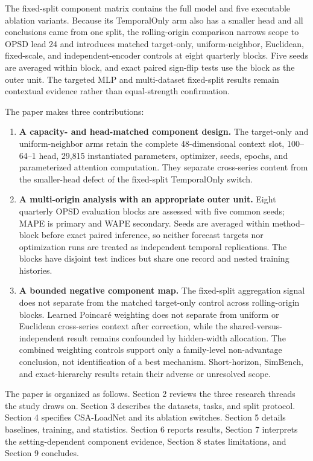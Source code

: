 \documentclass[electronics,article,submit,moreauthors]{Definitions/mdpi}
\providecommand{\tightlist}{\setlength{\itemsep}{0pt}\setlength{\parskip}{0pt}}
\begin{document}
The fixed-split component matrix contains the full model and five executable ablation variants. Because its TemporalOnly arm also has a smaller head and all conclusions came from one split, the rolling-origin comparison narrows scope to OPSD lead 24 and introduces matched target-only, uniform-neighbor, Euclidean, fixed-scale, and independent-encoder controls at eight quarterly blocks. Five seeds are averaged within block, and exact paired sign-flip tests use the block as the outer unit. The targeted MLP and multi-dataset fixed-split results remain contextual evidence rather than equal-strength confirmation.

The paper makes three contributions:

\begin{enumerate}
\def\labelenumi{\arabic{enumi}.}
\tightlist
\item
  \textbf{A capacity- and head-matched component design.} The target-only and uniform-neighbor arms retain the complete 48-dimensional context slot, 100--64--1 head, 29,815 instantiated parameters, optimizer, seeds, epochs, and parameterized attention computation. They separate cross-series content from the smaller-head defect of the fixed-split TemporalOnly switch.
\item
  \textbf{A multi-origin analysis with an appropriate outer unit.} Eight quarterly OPSD evaluation blocks are assessed with five common seeds; MAPE is primary and WAPE secondary. Seeds are averaged within method--block before exact paired inference, so neither forecast targets nor optimization runs are treated as independent temporal replications. The blocks have disjoint test indices but share one record and nested training histories.
\item
  \textbf{A bounded negative component map.} The fixed-split aggregation signal does not separate from the matched target-only control across rolling-origin blocks. Learned Poincar\'{e} weighting does not separate from uniform or Euclidean cross-series context after correction, while the shared-versus-independent result remains confounded by hidden-width allocation. The combined weighting controls support only a family-level non-advantage conclusion, not identification of a best mechanism. Short-horizon, SimBench, and exact-hierarchy results retain their adverse or unresolved scope.
\end{enumerate}

The paper is organized as follows. Section 2 reviews the three research threads the study draws on. Section 3 describes the datasets, tasks, and split protocol. Section 4 specifies CSA-LoadNet and its ablation switches. Section 5 details baselines, training, and statistics. Section 6 reports results, Section 7 interprets the setting-dependent component evidence, Section 8 states limitations, and Section 9 concludes.
\end{document}
